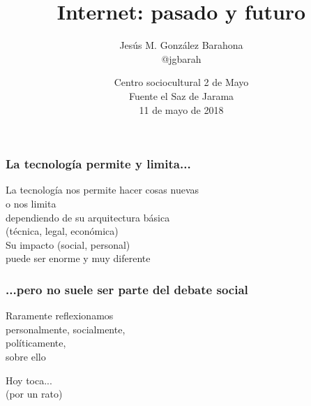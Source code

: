 \documentclass[17pt,aspectratio=169,hyperref=pdfusetitle]{beamer}
\title[Internet: pasado y futuro]{Internet: pasado y futuro}
\author[Jesús M. González Barahona]{Jesús M. González Barahona \\
@jgbarah}
\institute[URJC]{Universidad Rey Juan Carlos \\
}
\date{Centro sociocultural 2 de Mayo \\
  Fuente el Saz de Jarama \\
  11 de mayo de 2018}
\begin{document}
\begin{frame}
  \maketitle
\end{frame}


\begin{frame}
\frametitle{La tecnología permite y limita...}

\begin{flushright}
La tecnología nos permite hacer cosas nuevas \\
o nos limita \\
dependiendo de su arquitectura básica \\
(técnica, legal, económica) \\
\vspace{.2cm}
Su impacto (social, personal) \\
puede ser enorme y muy diferente \\
\end{flushright}

\end{frame}


\begin{frame}
\frametitle{...pero no suele ser parte del debate social}

\begin{center}
{\Large
Raramente reflexionamos\\
personalmente, socialmente, \\
políticamente, \\
sobre ello \\
}
\end{center}

\end{frame}


\begin{frame}

\begin{center}
{\Huge
Hoy toca... \\
(por un rato) \\
}
\end{center}

\end{frame}
\end{document}
